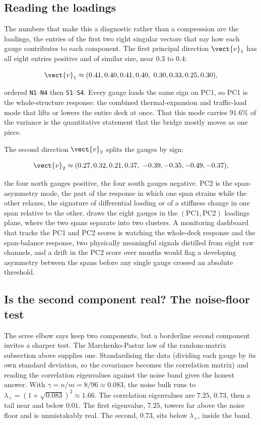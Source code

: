 \subsection{Reading the loadings}

The numbers that make this a diagnostic rather than a compression are
the loadings, the entries of the first two right singular vectors that
say how each gauge contributes to each component. The first principal
direction $\vect{v}_{1}$ has all eight entries positive and of similar
size, near $0.3$ to $0.4$:

\[
\vect{v}_{1} \approx (0.41, 0.40, 0.41, 0.40,\ 0.30, 0.33, 0.25, 0.30),
\]

ordered \texttt{N1}--\texttt{N4} then \texttt{S1}--\texttt{S4}. Every
gauge loads the same sign on PC1, so PC1 is the whole-structure
response: the combined thermal-expansion and traffic-load mode that
lifts or lowers the entire deck at once. That this mode carries $91.6\%$
of the variance is the quantitative statement that the bridge mostly
moves as one piece.

The second direction $\vect{v}_{2}$ splits the gauges by sign:

\[
\vect{v}_{2} \approx (0.27, 0.32, 0.21, 0.37,\ -0.39, -0.35, -0.49,
-0.37),
\]

the four north gauges positive, the four south gauges negative. PC2 is
the span-asymmetry mode, the part of the response in which one span
strains while the other relaxes, the signature of differential loading
or of a stiffness change in one span relative to the other.
 draws the eight gauges in the
$(\text{PC1}, \text{PC2})$ loadings plane, where the two spans separate
into two clusters. A monitoring dashboard that tracks the PC1 and PC2
scores is watching the whole-deck response and the span-balance
response, two physically meaningful signals distilled from eight raw
channels, and a drift in the PC2 score over months would flag a
developing asymmetry between the spans before any single gauge crossed
an absolute threshold.



\subsection{Is the second component real? The noise-floor test}

The scree elbow says keep two components, but a borderline second
component invites a sharper test. The Marchenko-Pastur law of the
random-matrix subsection above supplies one. Standardising the data
(dividing each gauge by its
own standard deviation, so the covariance becomes the correlation
matrix) and reading the correlation eigenvalues against the noise band
gives the honest answer. With $\gamma = n/m = 8/96 \approx 0.083$, the
noise bulk runs to $\lambda_{+} = (1 + \sqrt{0.083})^{2} \approx 1.66$.
The correlation eigenvalues are $7.25$, $0.73$, then a tail near and
below $0.01$. The first eigenvalue, $7.25$, towers far above the noise
floor and is unmistakably real. The second, $0.73$, sits below
$\lambda_{+}$, inside the band.

